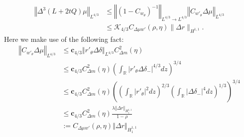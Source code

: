 \documentclass{amsart}
\theoremstyle{plain}
\theoremstyle{remark}
\numberwithin{equation}{section}
\newcommand{\norm}[2]{\left\Vert #1\right\Vert_{#2}}
\newcommand{\Twomat}[4]
{
\left[
	\begin{array}{cc}
		{#1}	&	{#2}	\\[10pt]
		{#3}	&	{#4}
		\end{array}
\right]
}
\begin{document}
\begin{align}
\norm{\Delta^3 (L+2tQ)\mu}{L^{4/3}} &\leq \norm{\left(1-C_{w_\theta}\right)^{-1}}{L^{4/3} \rightarrow L^{4/3}}\norm{C_{w'_\theta} \Delta\mu }{L^{4/3}}\\
\nonumber
&\leq \mathcal{K}_{4/3} C_{\Delta \mu w' }(\rho, \eta ) \|\Delta r\|_{H^{1,1}}.
\end{align}
    Here we make use of the following fact:
    \begin{align}
       \norm{C_{w'_\theta} \Delta\mu }{L^{4/3}} &\leq \mathbf{c}_{4/3}\norm{r'_\theta \Delta \delta }{L^{4/3}} C_{\Delta m}^2(\eta) \\
       \nonumber
      & \leq \mathbf{c}_{4/3}  C_{\Delta m}^2(\eta)  \left(\int_\mathbb{R} \left\vert  r'_\theta \Delta \delta_- \right\vert^{4/3} dz\right)^{3/4}\\
      \nonumber
      &\leq \mathbf{c}_{4/3}  C_{\Delta m}^2(\eta) 
      \left( \left(\int_\mathbb{R} |r'_\theta|^2 dz\right)^{2/3} \left(\int_\mathbb{R} |\Delta \delta_-|^4dz\right)^{1/3}\right)^{3/4}\\
      \nonumber
      &\leq   \mathbf{c}_{4/3}  C_{\Delta m}^2(\eta)   \frac{\lambda \norm{\Delta r}{H^{1,1}_1}}{1-\rho}\\
      \nonumber
      &:= C_{\Delta \mu w' }(\rho, \eta )\norm{\Delta r}{H^{1,1}_1}
      \end{align}


\end{document}

